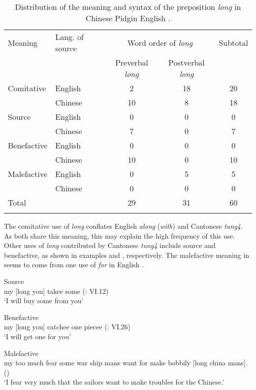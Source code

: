 \documentclass[output=paper]{langsci/langscibook}
\begin{document}
\begin{table} 
\begin{tabular}{llccc}
\lsptoprule
Meaning & Lang. of source & \multicolumn{2}{c}{Word order of \textit{long}} & Subtotal\\\cmidrule(lr){3-4}
&  & Preverbal \textit{long} & Postverbal \textit{long} & \\\midrule
Comitative & English & 2 & 18 & 20\\
& Chinese & 10 & 8 & 18\\
Source & English & 0 & 0 & 0\\
& Chinese & 7 & 0 & 7\\
Benefactive & English & 0 & 0 & 0\\
& Chinese & 10 & 0 & 10\\
Malefactive & English & 0 & 5 & 5\\
& Chinese & 0 & 0 & 0\\
\midrule
Total &  & 29 & 31 & 60\\
\lspbottomrule
\end{tabular}
\caption{\label{tab:7:1}Distribution of the meaning and syntax of the preposition \textit{long} in Chinese Pidgin English \citep{li_origins_2011}.}
\end{table}

The comitative use of \textit{long} conflates English \textit{along} (\textit{with}) and Cantonese \textit{tung4}. As both share this meaning, this may explain the high frequency of this use. Other uses of \textit{long} contributed by Cantonese \textit{tung4} include source and benefactive, as shown in examples  and , respectively. The malefactive meaning in  seems to come from one use of \textit{for} in English \citep{li_origins_2011}. 

\ea%
    \label{ex:7:7}
Source\\
my [long you] takee some (\citealt{tong_chinese_1862}: VI.12)\\
\glt ‘I will buy some from you’

\ex%
    \label{ex:7:8}
Benefactive\\
my [long you] catchee one piecee (\citealt{tong_chinese_1862}: VI.26)\\
\glt ‘I will get one for you’ 

\ex Malefactive\\
my too much fear some war ship mans want for make bobbily [long china mans]. (\citealt[968]{tilden_journal._1834})\\
\glt ‘I fear very much that the sailors want to make troubles for the Chinese.’
\z
    
\end{document}
